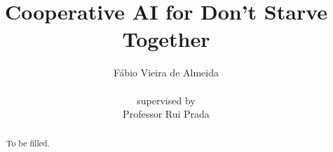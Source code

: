 \documentclass[runningheads, a4paper]{llncs}
\begin{document}
\title{Cooperative AI for Don't Starve Together}
\author{Fábio Vieira de Almeida\\  \\ supervised by\\ Professor Rui Prada}

\maketitle

\begin{abstract}
To be filled.
\end{abstract}

\tableofcontents
\newpage





\newpage

\printbibliography
\newpage

%
\end{document}
